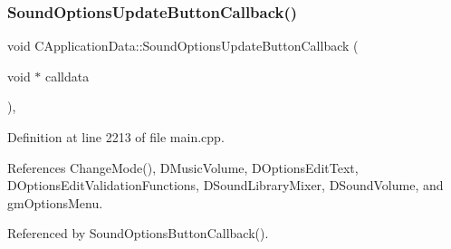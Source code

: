 \subsubsection{\texorpdfstring{Sound\+Options\+Update\+Button\+Callback()}{SoundOptionsUpdateButtonCallback()}}
{\footnotesize\ttfamily void C\+Application\+Data\+::\+Sound\+Options\+Update\+Button\+Callback (\begin{DoxyParamCaption}\item[{void $\ast$}]{calldata }\end{DoxyParamCaption})\hspace{0.3cm}{\ttfamily [static]}, {\ttfamily [protected]}}



Definition at line 2213 of file main.\+cpp.



References Change\+Mode(), D\+Music\+Volume, D\+Options\+Edit\+Text, D\+Options\+Edit\+Validation\+Functions, D\+Sound\+Library\+Mixer, D\+Sound\+Volume, and gm\+Options\+Menu.



Referenced by Sound\+Options\+Button\+Callback().


